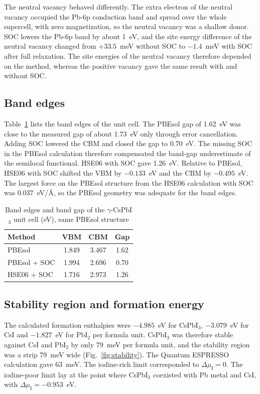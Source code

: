 The neutral vacancy behaved differently. The extra electron of the neutral vacancy occupied the Pb-6p conduction band and spread over the whole supercell, with zero magnetization, so the neutral vacancy was a shallow donor. SOC lowers the Pb-6p band by about 1~eV, and the site energy difference of the neutral vacancy changed from $+33.5$~meV without SOC to $-1.4$~meV with SOC after full relaxation. The site energies of the neutral vacancy therefore depended on the method, whereas the positive vacancy gave the same result with and without SOC.

\subsection{Band edges}

Table~\ref{tab:gaps} lists the band edges of the unit cell. The PBEsol gap of 1.62~eV was close to the measured gap of about 1.73~eV only through error cancellation. Adding SOC lowered the CBM and closed the gap to 0.70~eV. The missing SOC in the PBEsol calculation therefore compensated the band-gap underestimate of the semilocal functional. HSE06 with SOC gave 1.26~eV. Relative to PBEsol, HSE06 with SOC shifted the VBM by $-0.133$~eV and the CBM by $-0.495$~eV. The largest force on the PBEsol structure from the HSE06 calculation with SOC was 0.037~eV/\AA, so the PBEsol geometry was adequate for the band edges.

\begin{table}[htbp]
  \centering
  \caption{Band edges and band gap of the $\gamma$-CsPbI$_3$ unit cell (eV), same PBEsol structure}
  \label{tab:gaps}
  \begin{tabular}{lccc}
    \toprule
    Method & VBM & CBM & Gap \\
    \midrule
    PBEsol & 1.849 & 3.467 & 1.62 \\
    PBEsol + SOC & 1.994 & 2.696 & 0.70 \\
    HSE06 + SOC & 1.716 & 2.973 & 1.26 \\
    \bottomrule
  \end{tabular}
\end{table}

\subsection{Stability region and formation energy}

The calculated formation enthalpies were $-4.985$~eV for CsPbI$_3$, $-3.079$~eV for CsI and $-1.827$~eV for PbI$_2$ per formula unit. CsPbI$_3$ was therefore stable against CsI and PbI$_2$ by only 79~meV per formula unit, and the stability region was a strip 79~meV wide (Fig.~\ref{fig:stability}). The Quantum ESPRESSO calculation gave 63~meV. The iodine-rich limit corresponded to $\Delta\mu_\mathrm{I} = 0$. The iodine-poor limit lay at the point where CsPbI$_3$ coexisted with Pb metal and CsI, with $\Delta\mu_\mathrm{I} = -0.953$~eV.

